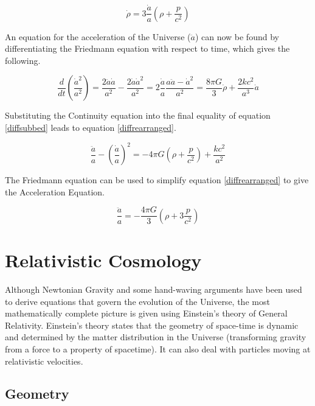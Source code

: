\documentclass[12pt]{article} %
\begin{document}
\begin{equation}\label{continuity}
\dot \rho = 3\frac{ \dot a}{a}(\rho +\frac{p}{c^2})
\end{equation}


An equation for the acceleration of the Universe ($\ddot a$) can now be found by differentiating the Friedmann equation with respect to time, which gives the following.

\begin{equation}\label{diffsubbed}
\frac{d}{dt} \left( \frac{\dot a ^2}{a ^2} \right) = \frac{2 \ddot a \dot a}{a^2} - \frac{2 \dot a \dot a^2}{a^2} = 2 \frac{\dot a}{a} \frac{a \ddot a - \dot a ^2}{a^2} = \frac{8\pi G}{3} \dot \rho + \frac{2k c^2}{a^3} \dot a
\end{equation} 

Substituting the Continuity equation into the final equality of equation \ref{diffsubbed} leads to equation \ref{diffrearranged}.

\begin{equation}\label{diffrearranged}
\frac{\ddot a}{a} - \left( \frac{\dot a}{a} \right)^2 = -4\pi G \left(\rho +\frac{p}{c^2} \right) + \frac{kc^2}{a^2}
\end{equation}

The Friedmann equation can be used to simplify equation \ref{diffrearranged} to give the Acceleration Equation\cite{cambridge}.

\begin{equation}\label{acceleration}
\frac{\ddot a}{a} =  -\frac{4\pi G}{3} \left( \rho +3\frac{p}{c^2} \right)
\end{equation}

\section{Relativistic Cosmology}

Although Newtonian Gravity and some hand-waving arguments have been used to derive equations that govern the evolution of the Universe, the most mathematically complete picture is given using Einstein's theory of General Relativity. Einstein's theory states that the geometry of space-time is dynamic and determined by the matter distribution in the Universe (transforming gravity from a force to a property of spacetime)\cite{coles}. It can also deal with particles moving at relativistic velocities\cite{mukhanov}.

\subsection{Geometry}
\end{document}
